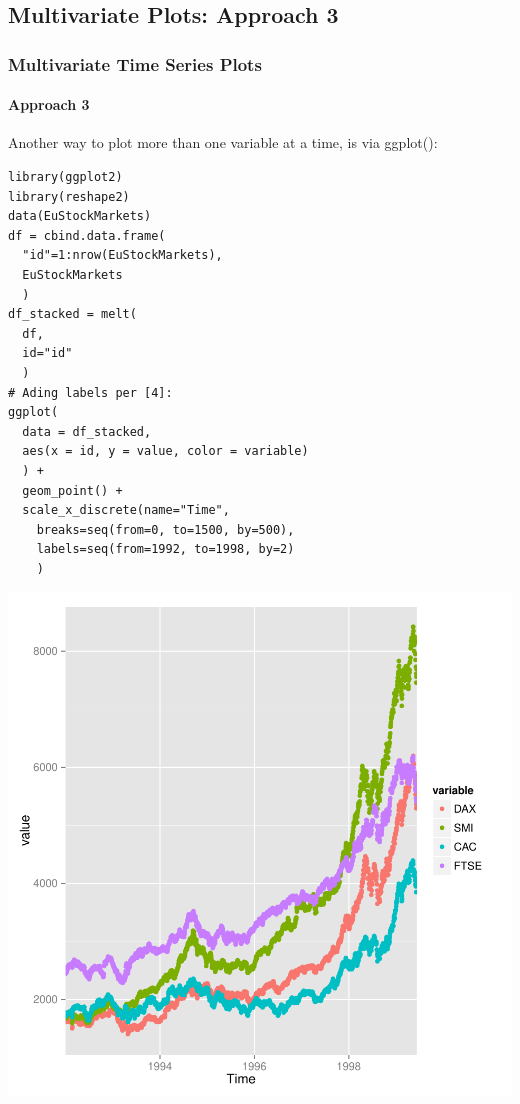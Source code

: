 \subsection{Multivariate Plots: Approach 3}
\begin{frame}
 \frametitle{Multivariate Time Series Plots}
 \framesubtitle{Approach 3}

Another way to plot more than one variable at a time, is via \ttfamily ggplot()\normalfont :
		\begin{lstlisting}
library(ggplot2)
library(reshape2)   
data(EuStockMarkets)
df = cbind.data.frame(
  "id"=1:nrow(EuStockMarkets),
  EuStockMarkets
  )
df_stacked = melt(
  df,
  id="id"
  )
# Ading labels per [4]:
ggplot(
  data = df_stacked,
  aes(x = id, y = value, color = variable)
  ) +
  geom_point() +
  scale_x_discrete(name="Time",
    breaks=seq(from=0, to=1500, by=500),
    labels=seq(from=1992, to=1998, by=2)
    )
		\end{lstlisting}

       \begin{center}
         \includegraphics[scale=0.4]{images/stockPlot2.pdf}
        \end{center}
\end{frame}
%

